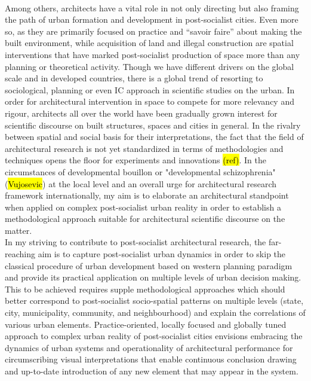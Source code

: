 \documentclass[11pt]{report}
\begin{document}
\\
Among others, architects have a vital role in not only directing but also framing the path of urban formation and development in post-socialist cities. Even more so, as they are primarily focused on practice and “savoir faire” about making the built environment, while acquisition of land and illegal construction are spatial interventions that have marked post-socialist production of space more than any planning or theoretical activity. Though we have different drivers on the global scale and in developed countries, there is a global trend of resorting to sociological, planning or even IC approach in scientific studies on the urban. 
In order for architectural intervention in space to compete for more relevancy and rigour,  architects all over the world have been gradually grown interest for scientific discourse on built structures, spaces and cities in general.  In the rivalry between spatial and social basis for their interpretations, the fact that the field of architectural research is not yet standardized in terms of methodologies and techniques opens the floor for experiments and innovations \hl{(ref)}. In the circumstances of developmental bouillon or "developmental schizophrenia"(\hl{Vujosevic}) at the local level and an overall urge for architectural research framework internationally, my aim is to elaborate an architectural standpoint when applied on complex post-socialist urban reality in order to establish a methodological approach suitable for architectural scientific discourse on the matter.
\\
In my striving to contribute to post-socialist architectural research, the far-reaching aim is to capture post-socialist urban dynamics  in order to skip the classical procedure of urban development based on western planning paradigm and provide its practical application on multiple levels of urban decision making. This to be achieved requires supple methodological approaches which should better correspond to post-socialist socio-spatial patterns on multiple levels (state, city, municipality, community, and neighbourhood) and explain the correlations of various urban elements. Practice-oriented, locally focused and globally tuned  approach to complex urban reality of post-socialist cities envisions embracing the dynamics of urban systems and operationality of architectural performance for circumscribing visual interpretations that enable continuous conclusion drawing and up-to-date introduction of any new element that may appear in the system.
\end{document}
